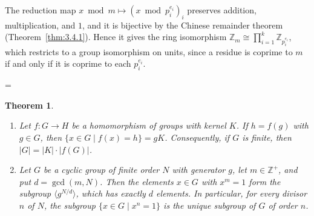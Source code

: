 \documentclass[11pt]{article}
\makeatletter
\theoremstyle{ntstyle}
\newtheorem{theorem}{Theorem}[subsection]
\newcommand{\statementitems}{\mbox{}}
\let\nt@closedisplay\]
\def\nt@guardedclose{\@ifnextchar\par{\nt@closeafterpar}{\@ifnextchar\end{\postdisplaypenalty\@M\nt@closedisplay}{\nt@closedisplay}}}
\def\nt@closeafterpar\par{\@ifnextchar\par{\nt@closeafterpar}{\@ifnextchar\end{\postdisplaypenalty\@M\nt@closedisplay\par}{\nt@closedisplay\par}}}
\renewenvironment{proof}[1][\proofname]{\par
  \pushQED{\qed}\normalfont\topsep\medskipamount\edef\nt@afterproof{\@endparpenalty=\the\@endparpenalty\relax}\@beginparpenalty\@M\@endparpenalty\@M\let\]\nt@guardedclose\trivlist\item[]\textit{#1\@addpunct{.}} \ignorespaces}{\ifvmode\addpenalty\@M\fi\popQED\nt@afterproof\endtrivlist\@endpefalse}
\makeatother
\begin{document}
\begin{proof} The reduction map $x\bmod m\mapsto(x\bmod p_i^{e_i})_{i}$ preserves
	addition, multiplication, and $1$, and it is bijective by the Chinese
	remainder theorem (Theorem~\ref{thm:3.4.1}). Hence it gives the ring
	isomorphism $\mathbb{Z}_m \cong \prod_{i=1}^{k}\mathbb{Z}_{p_i^{e_i}}$,
	which restricts to a group isomorphism on units, since a residue is
	coprime to $m$ if and only if it is coprime to each $p_i^{e_i}$.

\end{proof}
\begin{theorem}\label{thm:6.6.5}\statementitems

	\begin{enumerate}[label={\alph*)}]
		\item Let $f:G\to H$ be a homomorphism of groups with kernel $K$. If
		      $h=f(g)$ with $g\in G$, then $\{x\in G\mid f(x)=h\}=gK$.
		      Consequently, if $G$ is finite, then $|G|=|K|\cdot|f(G)|$.
		\item Let $G$ be a cyclic group of finite order $N$ with generator $g$,
		      let $m\in\mathbb{Z}^+$, and put $d=\gcd(m,N)$. Then the elements
		      $x\in G$ with $x^m=1$ form the subgroup $\langle g^{N/d}\rangle$,
		      which has exactly $d$ elements. In particular, for every divisor $n$
		      of $N$, the subgroup $\{x\in G\mid x^n=1\}$ is the unique subgroup of
		      $G$ of order $n$.
	\end{enumerate}

\end{theorem}
\end{document}
